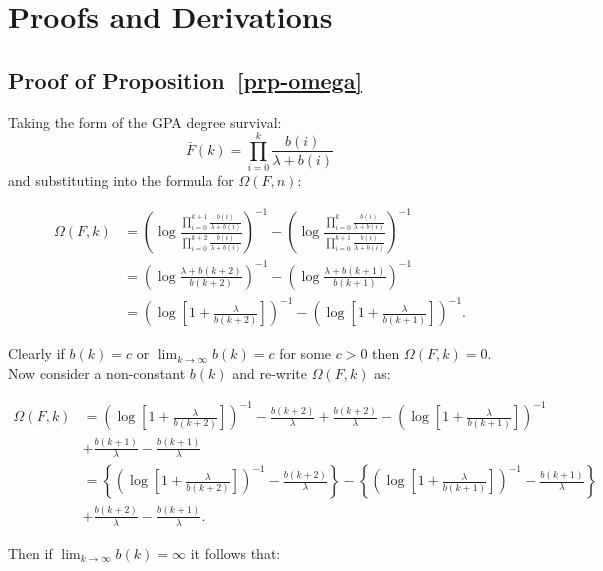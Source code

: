 \documentclass[
  sn-basic,
]{sn-jnl}
\theoremstyle{plain}
\theoremstyle{plain}
\theoremstyle{remark}
\begin{document}
\section{Proofs and Derivations}\label{sec-proofs}

\subsection{\texorpdfstring{Proof of
Proposition~\ref{prp-omega}}{Proof of Proposition~}}\label{proof-of-prp-omega}

Taking the form of the GPA degree survival: \[
\bar F(k) = \prod_{i=0}^k\frac{b(i)}{\lambda+b(i)}
\] and substituting into the formula for \(\Omega(F,n)\):

\begin{align*}
\Omega(F,k)&=\left(\log\frac{\prod_{i=0}^{k+1}\frac{b(i)}{\lambda+b(i)}}{\prod_{i=0}^{k+2}\frac{b(i)}{\lambda+b(i)}}\right)^{-1}-\left(\log\frac{\prod_{i=0}^{k}\frac{b(i)}{\lambda+b(i)}}{\prod_{i=0}^{k+1}\frac{b(i)}{\lambda+b(i)}}\right)^{-1}\\
&=\left(\log\frac{\lambda+b(k+2)}{b(k+2)}\right)^{-1}-\left(\log\frac{\lambda+b(k+1)}{b(k+1)}\right)^{-1}\\
&=\left(\log\left[1+\frac{\lambda}{b(k+2)}\right]\right)^{-1}-\left(\log\left[1+\frac{\lambda}{b(k+1)}\right]\right)^{-1}.
\end{align*}

Clearly if \(b(k)=c\) or \(\lim_{k\rightarrow\infty}b(k)=c\) for some
\(c>0\) then \(\Omega(F,k)=0\). Now consider a non-constant \(b(k)\) and
re-write \(\Omega(F,k)\) as:

\begin{align*}
\Omega(F,k) &= \left(\log\left[1+\frac{\lambda}{b(k+2)}\right]\right)^{-1}-\frac{b(k+2)}{\lambda}+\frac{b(k+2)}{\lambda}-\left(\log\left[1+\frac{\lambda}{b(k+1)}\right]\right)^{-1}\\&+\frac{b(k+1)}{\lambda}  -\frac{b(k+1)}{\lambda}\\
&=\left\{ \left(\log\left[1+\frac{\lambda}{b(k+2)}\right]\right)^{-1}-\frac{b(k+2)}{\lambda}\right\} - \left\{ \left(\log\left[1+\frac{\lambda}{b(k+1)}\right]\right)^{-1}-\frac{b(k+1)}{\lambda}\right\}\\&+\frac{b(k+2)}{\lambda}-\frac{b(k+1)}{\lambda}.
\end{align*}

Then if \(\lim_{k\rightarrow\infty}b(k)=\infty\) it follows that:
\end{document}
